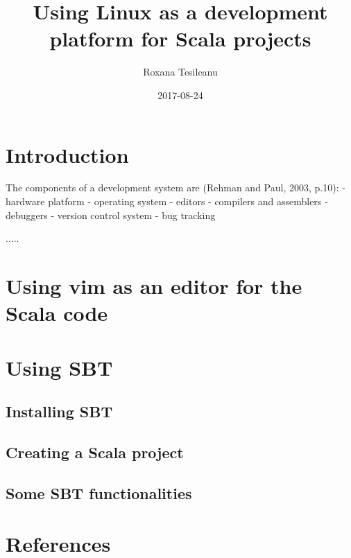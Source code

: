 \documentclass{article}
\title{Using Linux as a development platform for Scala projects}
\date{2017-08-24}
\author{Roxana Tesileanu}
\begin{document}
	\maketitle
	\newpage

\section{Introduction}
The components of a development system are (Rehman and Paul, 2003, p.10):\newline
- hardware platform \newline
- operating system \newline
- editors \newline
- compilers and assemblers \newline
- debuggers \newline
- version control system \newline
- bug tracking \newline

.....

\section{Using vim as an editor for the Scala code}
\section{Using SBT}
\subsection{Installing SBT}
\subsection{Creating a Scala project}
\subsection{Some SBT functionalities}
\section{References}

  
\end{document}
